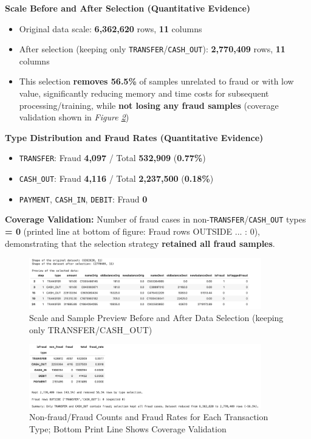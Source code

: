\documentclass[sigplan,screen]{acmart}
\begin{document}
\textbf{Scale Before and After Selection (Quantitative Evidence)}

\begin{itemize}
    \item Original data scale: \textbf{6,362,620} rows, \textbf{11} columns
    \item After selection (keeping only \texttt{TRANSFER}/\texttt{CASH\_OUT}): \textbf{2,770,409} rows, \textbf{11} columns
    \item This selection \textbf{removes 56.5\%} of samples unrelated to fraud or with low value, significantly reducing memory and time costs for subsequent processing/training, while \textbf{not losing any fraud samples} (coverage validation shown in \textit{Figure \ref{fig:fraud_by_type}})
\end{itemize}
    
\textbf{Type Distribution and Fraud Rates (Quantitative Evidence)}

\begin{itemize}
    \item \texttt{TRANSFER}: Fraud \textbf{4,097} / Total \textbf{532,909} (\textbf{0.77\%})
    \item \texttt{CASH\_OUT}: Fraud \textbf{4,116} / Total \textbf{2,237,500} (\textbf{0.18\%})
    \item \texttt{PAYMENT}, \texttt{CASH\_IN}, \texttt{DEBIT}: Fraud \textbf{0}
\end{itemize}

\textbf{Coverage Validation:} Number of fraud cases in non-\texttt{TRANSFER}/\texttt{CASH\_OUT} types \textbf{= 0} (printed line at bottom of figure: Fraud rows OUTSIDE ... : 0), demonstrating that the selection strategy \textbf{retained all fraud samples}.

\begin{figure}[h!]
    \centering
    \includegraphics[width=0.9\textwidth]{3.1a.png}
    \caption{Scale and Sample Preview Before and After Data Selection (keeping only TRANSFER/CASH\_OUT)}
    \label{fig:data_selection_scale}
\end{figure}

\begin{figure}[h!]
    \centering
    \includegraphics[width=0.9\textwidth]{3.1b.png}
    \caption{Non-fraud/Fraud Counts and Fraud Rates for Each Transaction Type; Bottom Print Line Shows Coverage Validation}
    \label{fig:fraud_by_type}
\end{figure}
\end{document}
